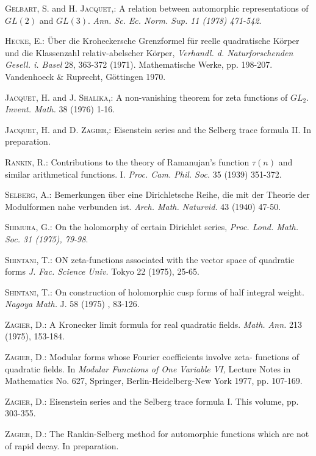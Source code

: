 \begin{thebibliography}{99}
 \textsc{Gelbart, S.} and \textsc{H. Jacquet,:} A relation between automorphic representations of $GL(2)$ and $GL(3)$. \textit{Ann. Sc. Ec. Norm. Sup. 11 (1978) 471-542}.

 \textsc{Hecke, E.:} \"Uber die Kroheckersche Grenzformel f\"ur reelle quadratische K\"orper und die Klassenzahl relativ-abelscher K\"orper, \textit{Verhandl. d. Naturforschenden Gesell. i. Basel} 28, 363-372 (1971). Mathematische Werke, pp. 198-207. Vandenhoeck \& Ruprecht, G\"ottingen 1970.

 \textsc{Jacquet, H.} and \textsc{J. Shalika},: A non-vanishing theorem for zeta functions of $GL_2$. \textit{Invent. Math.} 38 (1976) 1-16.

 \textsc{Jacquet, H.} and \textsc{D. Zagier,:} Eisenstein series and the Selberg trace formula II. In preparation. 

 \textsc{Rankin, R.:} Contributions to the theory of Ramanujan's function $\tau(n)$ and similar arithmetical functions. I. \textit{Proc. Cam. Phil. Soc.} 35 (1939) 351-372.

 \textsc{Selberg, A.:} Bemerkungen \"uber eine Dirichletsche Reihe, die mit der Theorie der Modulformen nahe verbunden ist. \textit{Arch. Math. Naturvid.} 43 (1940) 47-50.

 \textsc{Shimura, G.:} On the holomorphy of certain Dirichlet series, \textit{Proc. Lond. Math. Soc. 31 (1975), 79-98}.

 \textsc{Shintani, T.:} ON zeta-functions associated with the vector space of quadratic forms \textit{J. Fac. Science Univ.} Tokyo 22 (1975), 25-65.

 \textsc{Shintani, T.:} On construction of holomorphic cusp forms of half integral weight. \textit{Nagoya Math.} J. 58 (1975) , 83-126.

 \textsc{Zagier, D.:} A Kronecker limit formula for real quadratic fields. \textit{Math. Ann.} 213 (1975), 153-184.

 \textsc{Zagier, D.:} Modular forms whose Fourier coefficients involve zeta- functions  of quadratic fields. In \textit{Modular Functions of One Variable VI,} Lecture Notes in Mathematics No. 627, Springer, Berlin-Heidelberg-New York 1977, pp. 107-169.

 \textsc{Zagier, D.:} Eisenstein series and the Selberg trace formula I. This volume, pp. 303-355.

 \textsc{Zagier, D.:} The Rankin-Selberg method for automorphic functions which are not of rapid decay. In preparation.
\end{thebibliography}
